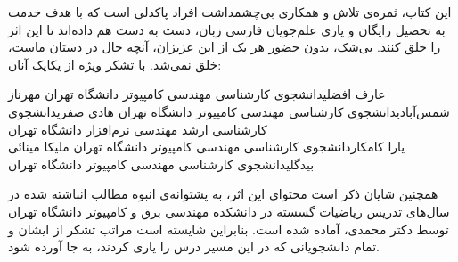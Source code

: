 \newpage
\thispagestyle{empty}

\scriptsize{
\p
این کتاب، ثمره‌ی تلاش و همکاری بی‌چشمداشت افراد پاکدلی است
که با هدف خدمت به تحصیل رایگان و یاری علم‌جویان فارسی زبان،
دست به دست هم داده‌اند تا این اثر را خلق کنند.
بی‌شک، بدون حضور هر یک از این عزیزان، آنچه حال در دستان ماست،
خلق نمی‌شد. با تشکر ویژه از یکایک آنان:
}

\scriptsize{
    \begin{AFFILIATIONS}
        \AFFILIATIONROW
        {عارف افضلی}{دانشجوی کارشناسی مهندسی کامپیوتر دانشگاه تهران}{}
        {مهرناز شمس‌آبادی}{دانشجوی کارشناسی مهندسی کامپیوتر دانشگاه تهران}{}
        {هادی صفری}{دانشجوی کارشناسی ارشد مهندسی نرم‌افزار دانشگاه تهران}{}
        \\\AFFILIATIONROW
        {یارا کامکار}{دانشجوی کارشناسی مهندسی کامپیوتر دانشگاه تهران}{}
        {ملیکا مینائی بیدگلی}{دانشجوی کارشناسی مهندسی کامپیوتر دانشگاه تهران}{}
        {}{}{}
        \\\AFFILIATIONROW
        {}{}{}
        {}{}{}
        {}{}{}
    \end{AFFILIATIONS}
}

\scriptsize{
\p
همچنین شایان ذکر است محتوای این اثر،
به پشتوانه‌ی انبوه مطالب انباشته شده در سال‌های تدریس ریاضیات گسسته
در دانشکده مهندسی برق و کامپیوتر دانشگاه تهران
توسط دکتر محمدی، آماده شده است.
بنابراین شایسته است مراتب تشکر از ایشان و تمام دانشجویانی که در این مسیر
درس را یاری کردند، به جا آورده شود.
}